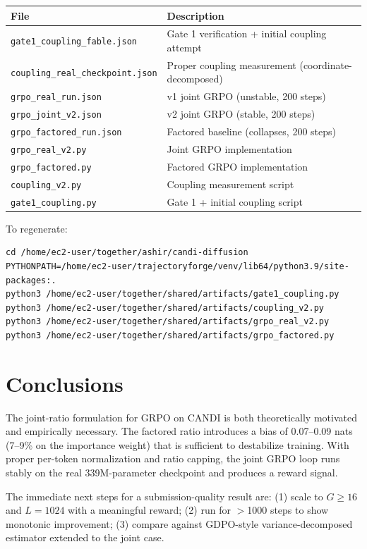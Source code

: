 \documentclass{article}
\begin{document}
\begin{tabular}{lp{8cm}}
\toprule
File & Description \\
\midrule
\texttt{gate1\_coupling\_fable.json} & Gate 1 verification + initial coupling attempt \\
\texttt{coupling\_real\_checkpoint.json} & Proper coupling measurement (coordinate-decomposed) \\
\texttt{grpo\_real\_run.json} & v1 joint GRPO (unstable, 200 steps) \\
\texttt{grpo\_joint\_v2.json} & v2 joint GRPO (stable, 200 steps) \\
\texttt{grpo\_factored\_run.json} & Factored baseline (collapses, 200 steps) \\
\texttt{grpo\_real\_v2.py} & Joint GRPO implementation \\
\texttt{grpo\_factored.py} & Factored GRPO implementation \\
\texttt{coupling\_v2.py} & Coupling measurement script \\
\texttt{gate1\_coupling.py} & Gate 1 + initial coupling script \\
\bottomrule
\end{tabular}

To regenerate:
\begin{verbatim}
cd /home/ec2-user/together/ashir/candi-diffusion
PYTHONPATH=/home/ec2-user/trajectoryforge/venv/lib64/python3.9/site-packages:.
python3 /home/ec2-user/together/shared/artifacts/gate1_coupling.py
python3 /home/ec2-user/together/shared/artifacts/coupling_v2.py
python3 /home/ec2-user/together/shared/artifacts/grpo_real_v2.py
python3 /home/ec2-user/together/shared/artifacts/grpo_factored.py
\end{verbatim}

\section{Conclusions}

The joint-ratio formulation for GRPO on CANDI is both theoretically motivated and empirically necessary. The factored ratio introduces a bias of 0.07--0.09 nats (7--9\% on the importance weight) that is sufficient to destabilize training. With proper per-token normalization and ratio capping, the joint GRPO loop runs stably on the real 339M-parameter checkpoint and produces a reward signal.

The immediate next steps for a submission-quality result are: (1) scale to $G\geq16$ and $L{=}1024$ with a meaningful reward; (2) run for $>$1000 steps to show monotonic improvement; (3) compare against GDPO-style variance-decomposed estimator extended to the joint case.
\end{document}
